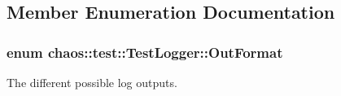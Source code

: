 \subsection{Member Enumeration Documentation}
\hypertarget{classchaos_1_1test_1_1_test_logger_a8e6f679501d623e41ac0f0c445a7820d}{}
\subsubsection[{Out\+Format}]{\setlength{\rightskip}{0pt plus 5cm}enum {\bf chaos\+::test\+::\+Test\+Logger\+::\+Out\+Format}}\label{classchaos_1_1test_1_1_test_logger_a8e6f679501d623e41ac0f0c445a7820d}


The different possible log outputs. 

